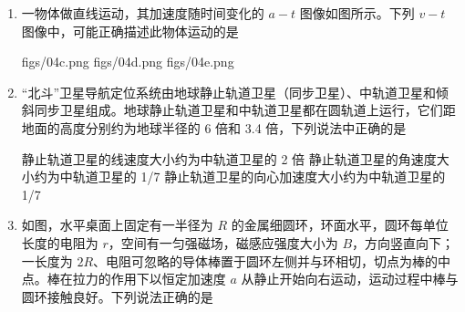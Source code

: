\documentclass[\gkver]{gaokaozhenti}
\begin{document}
\begin{enumerate}
\item
一物体做直线运动，其加速度随时间变化的 $a-t$ 图像如图所示。下列 $v-t$ 图像中，可能正确描述此物体运动的是


{figs/04c.png}
{figs/04d.png}
{figs/04e.png}


\item
“北斗”卫星导航定位系统由地球静止轨道卫星（同步卫星）、中轨道卫星和倾斜同步卫星组成。地球静止轨道卫星和中轨道卫星都在圆轨道上运行，它们距地面的高度分别约为地球半径的 6 倍和 3.4 倍，下列说法中正确的是

{静止轨道卫星的线速度大小约为中轨道卫星的 2 倍}
{静止轨道卫星的角速度大小约为中轨道卫星的 1/7}
{静止轨道卫星的向心加速度大小约为中轨道卫星的 1/7}


\item
如图，水平桌面上固定有一半径为 $R$ 的金属细圆环，环面水平，圆环每单位长度的电阻为 $r$，空间有一匀强磁场，磁感应强度大小为 $B$，方向竖直向下；一长度为 $2R$、电阻可忽略的导体棒置于圆环左侧并与环相切，切点为棒的中点。棒在拉力的作用下以恒定加速度 $a$ 从静止开始向右运动，运动过程中棒与圆环接触良好。下列说法正确的是



\end{enumerate}
\end{document}
